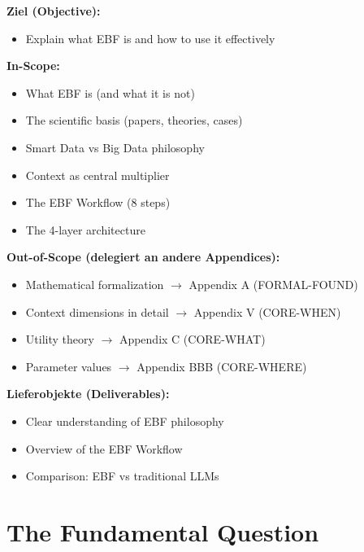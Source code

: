 \begin{tcolorbox}[
    colback=orange!5!white,
    colframe=orange!75!black,
    title={\textbf{Appendix Scope: Ziel / In-Scope / Out-of-Scope / Constraints}},
    fonttitle=\bfseries
]

\textbf{Ziel (Objective):}
\begin{itemize}[nosep]
    \item Explain what EBF is and how to use it effectively
\end{itemize}

\textbf{In-Scope:}
\begin{itemize}[nosep]
    \item What EBF is (and what it is not)
    \item The scientific basis (papers, theories, cases)
    \item Smart Data vs Big Data philosophy
    \item Context as central multiplier
    \item The EBF Workflow (8 steps)
    \item The 4-layer architecture
\end{itemize}

\textbf{Out-of-Scope (delegiert an andere Appendices):}
\begin{itemize}[nosep]
    \item Mathematical formalization $\rightarrow$ Appendix A (FORMAL-FOUND)
    \item Context dimensions in detail $\rightarrow$ Appendix V (CORE-WHEN)
    \item Utility theory $\rightarrow$ Appendix C (CORE-WHAT)
    \item Parameter values $\rightarrow$ Appendix BBB (CORE-WHERE)
\end{itemize}

\textbf{Lieferobjekte (Deliverables):}
\begin{itemize}[nosep]
    \item Clear understanding of EBF philosophy
    \item Overview of the EBF Workflow
    \item Comparison: EBF vs traditional LLMs
\end{itemize}

\end{tcolorbox}


\section{The Fundamental Question}
\label{sec:ref-ebf-fundamental}

